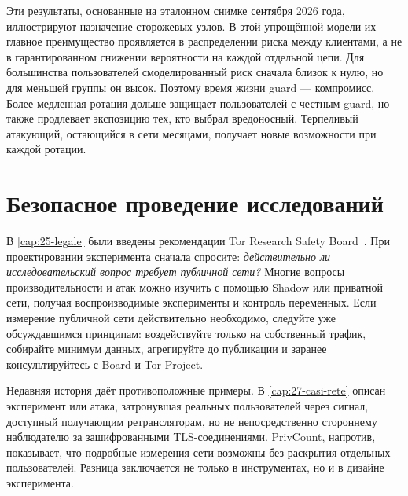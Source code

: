 Эти результаты, основанные на эталонном снимке сентября 2026 года, иллюстрируют назначение сторожевых узлов. В этой упрощённой модели их главное преимущество проявляется в распределении риска между клиентами, а не в гарантированном снижении вероятности на каждой отдельной цепи. Для большинства пользователей смоделированный риск сначала близок к нулю, но для меньшей группы он высок. Поэтому время жизни guard — компромисс. Более медленная ротация дольше защищает пользователей с честным guard, но также продлевает экспозицию тех, кто выбрал вредоносный. Терпеливый атакующий, остающийся в сети месяцами, получает новые возможности при каждой ротации.

\section{Безопасное проведение исследований}\label{sec:ric-sicurezza}

В \cref{cap:25-legale} были введены рекомендации Tor Research Safety Board~\cite{trsb}. При проектировании эксперимента сначала спросите: \emph{действительно ли исследовательский вопрос требует публичной сети?} Многие вопросы производительности и атак можно изучить с помощью Shadow или приватной сети, получая воспроизводимые эксперименты и контроль переменных. Если измерение публичной сети действительно необходимо, следуйте уже обсуждавшимся принципам: воздействуйте только на собственный трафик, собирайте минимум данных, агрегируйте до публикации и заранее консультируйтесь с Board и Tor Project.

Недавняя история даёт противоположные примеры. В \cref{cap:27-casi-rete} описан эксперимент или атака, затронувшая реальных пользователей через сигнал, доступный получающим ретрансляторам, но не непосредственно стороннему наблюдателю за зашифрованными TLS-соединениями. PrivCount, напротив, показывает, что подробные измерения сети возможны без раскрытия отдельных пользователей. Разница заключается не только в инструментах, но и в дизайне эксперимента.

